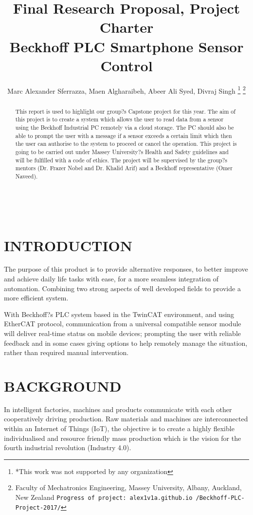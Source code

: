 \documentclass[a4paper, 10pt, conference]{IEEEconf}
\title{\LARGE \bf
Final Research Proposal, Project Charter\\Beckhoff PLC Smartphone Sensor Control
}
\author{Marc Alexander Sferrazza, Maen Algharaibeh, Abeer Ali Syed, Divraj Singh%
\thanks{*This work was not supported by any organization}%
\thanks{Faculty of Mechatronics Engineering, Massey University, Albany, Auckland, New Zealand
        {\tt\small Progress of project: alex1v1a.github.io /Beckhoff-PLC-Project-2017/}}%
}
\begin{document}
\begin{figure}
	\centering
	
\end{figure}

\

\maketitle
\thispagestyle{empty}
\pagestyle{empty}


\begin{abstract}

This report is used to highlight our group?s Capstone project for this year. The aim of this project is to create a system which allows the user to read data from a sensor using the Beckhoff Industrial PC remotely via a cloud storage. The PC should also be able to prompt the user with a message if a sensor exceeds a certain limit which then the user can authorise to the system to proceed or cancel the operation.  This project is going to be carried out under Massey University?s Health and Safety guidelines and will be fulfilled with a code of ethics. The project will be supervised by the group?s mentors (Dr. Frazer Nobel and Dr. Khalid Arif) and a Beckhoff representative (Omer Naveed).

\end{abstract}


\section{INTRODUCTION}
The purpose of this product is to provide alternative responses, to better improve and achieve daily life tasks with ease, for a more seamless integration of automation. Combining two strong aspects of well developed fields to provide a more efficient system.

With Beckhoff?s PLC system based in the TwinCAT environment, and using EtherCAT protocol, communication from a universal compatible sensor module will deliver real-time status on mobile devices; prompting the user with reliable feedback and in some cases giving options to help remotely manage the situation, rather than required manual intervention.

\section{BACKGROUND}
In intelligent factories, machines and products communicate with each other cooperatively driving production. Raw materials and machines are interconnected within an Internet of Things (IoT), the objective is to create a highly flexible individualised and resource friendly mass production which is the vision for the fourth industrial revolution (Industry 4.0).
\end{document}
